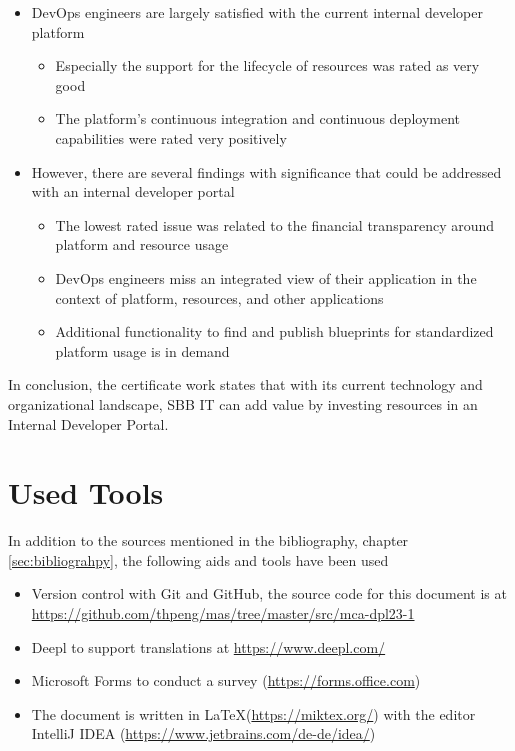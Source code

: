 \documentclass[a4paper,12pt]{article}
\begin{document}
    \begin{itemize}
        \item DevOps engineers are largely satisfied with the current internal developer platform
        \begin{itemize}
            \item Especially the support for the lifecycle of resources was rated as very good
            \item The platform's continuous integration and continuous deployment capabilities were rated very positively
        \end{itemize}

        \item However, there are several findings with significance that could be addressed with an internal developer portal
        \begin{itemize}
            \item The lowest rated issue was related to the financial transparency around platform and resource usage
            \item DevOps engineers miss an integrated view of their application in the context of platform, resources, and other applications
            \item Additional functionality to find and publish blueprints for standardized platform usage is in demand
        \end{itemize}
    \end{itemize}

    In conclusion, the certificate work states that with its current technology and organizational landscape, SBB IT
    can add value by investing resources in an Internal Developer Portal.

    \pagebreak


    \tableofcontents
    \pagebreak

    \section*{Used Tools}
    In addition to the sources mentioned in the bibliography, chapter \ref{sec:bibliograhpy}, the following aids and tools have been used
    \begin{itemize}
        \item Version control with Git and GitHub, the source code for this document is at \url{https://github.com/thpeng/mas/tree/master/src/mca-dpl23-1}
        \item Deepl to support translations at \url{https://www.deepl.com/}
        \item Microsoft Forms to conduct a survey (\url{https://forms.office.com})
        \item The document is written in \LaTeX  (\url{https://miktex.org/}) with the editor IntelliJ IDEA (\url{https://www.jetbrains.com/de-de/idea/})
    \end{itemize}
\end{document}
